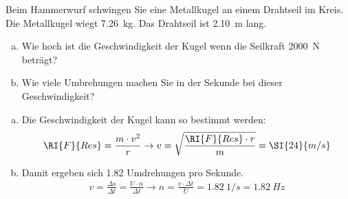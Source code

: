 \begin{aufgabe}
Beim Hammerwurf schwingen Sie eine Metallkugel an einem Drahtseil im Kreis.
Die Metallkugel wiegt \SI{7.26}{kg}.
Das Drahtseil ist \SI{2.10}{m} lang.

\begin{enumerate}[a)]
\item Wie hoch ist die Geschwindigkeit der Kugel wenn die Seilkraft \SI{2000}{N} beträgt?
\item Wie viele Umbrehungen machen Sie in der Sekunde bei dieser Geschwindigkeit?
\end{enumerate}



\begin{loesung}
	\begin{enumerate} [a)]
		\item Die Geschwindigkeit der Kugel kann so bestimmt werden:
		\begin{eqnarray*}
			\RI{F}{Res}=\frac{m\cdot v^2}{r}\to v=\sqrt{\frac{\RI{F}{Res}\cdot r}{m}}=\SI{24}{m/s}
		\end{eqnarray*}
		\item Damit ergeben sich \num{1.82} Umdrehungen pro Sekunde.
		\begin{eqnarray*}
			v=\frac{\Delta s}{\Delta t}=\frac{U\cdot n}{\Delta t}\to n=\frac{v\cdot \Delta t}{U}=\SI{1.82}{1/s}=\SI{1.82}{Hz}
		\end{eqnarray*}
	\end{enumerate}
%
%
\end{loesung}



\end{aufgabe}
